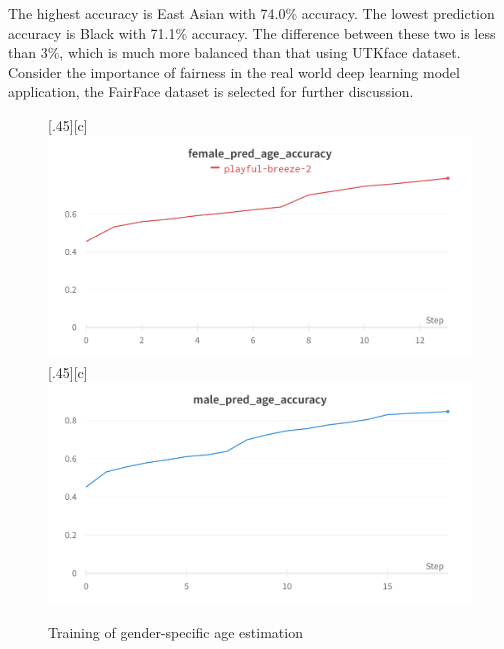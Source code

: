 \documentclass[DIV=calc, paper=a4, fontsize=10pt, twocolumn]{article}
\begin{document}
	The highest accuracy is East Asian with 74.0\% accuracy. The lowest prediction accuracy is Black with 71.1\% accuracy. The difference between these two is less than 3\%, which is much more balanced than that using UTKface dataset. Consider the importance of fairness in the real world deep learning model application, the FairFace dataset is selected for further discussion.
	
	
	\begin{figure}[t]
		\centering
		\subcaptionbox{}[.45\linewidth][c]{%
			\includegraphics[width=\linewidth]{imgs/female_age.png}}\quad
		\subcaptionbox{}[.45\linewidth][c]{%
			\includegraphics[width=\linewidth]{imgs/male_age.png}}
		\caption{Training of gender-specific age estimation}
		\label{fig:gender_specific_age}
	\end{figure}
	
\end{document}
